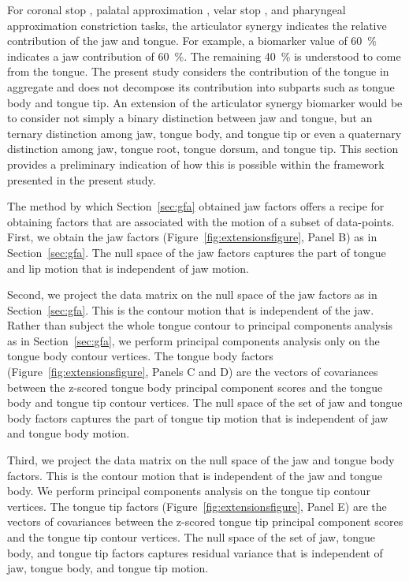 \documentclass[preprint]{JASAnew}\usepackage[]{graphicx}\usepackage[]{color}
\begin{document}
For coronal stop \textipa{[t]}, palatal approximation \textipa{[i]}, velar stop \textipa{[k]}, and pharyngeal approximation \textipa{[A]} constriction tasks,
the articulator synergy indicates the relative contribution of the jaw and tongue.
%
For example, a biomarker value of \SI{60}{\percent} indicates a jaw contribution of  \SI{60}{\percent}. The remaining \SI{40}{\percent} is understood to come from the tongue.
%
The present study considers the contribution of the tongue in aggregate and does not decompose its contribution into subparts such as tongue body and tongue tip.
%
An extension of the articulator synergy biomarker would be to consider not simply a binary distinction between jaw and tongue, but an ternary distinction among jaw, tongue body, and tongue tip or even a quaternary distinction among jaw, tongue root, tongue dorsum, and tongue tip.
%
This section provides a preliminary indication of how this is possible within the framework presented in the present study.



The method by which Section~\ref{sec:gfa} obtained jaw factors offers a recipe for obtaining factors that are associated with the motion of a subset of data-points. 
First, we obtain the jaw factors (Figure~\ref{fig:extensionsfigure}, Panel B) as in Section~\ref{sec:gfa}.
The null space of the jaw factors captures the part of tongue and lip motion that is independent of jaw motion. 

Second, we project the data matrix on the null space of the jaw factors as in Section~\ref{sec:gfa}. This is the contour motion that is independent of the jaw.
Rather than subject the whole tongue contour to principal components analysis as in Section~\ref{sec:gfa}, we perform principal components analysis only on the tongue body contour vertices.
The tongue body factors (Figure~\ref{fig:extensionsfigure}, Panels C and D) are the vectors of covariances between the z-scored tongue body principal component scores and the tongue body and tongue tip contour vertices.
The null space of the set of jaw and tongue body factors captures the part of tongue tip motion that is independent of jaw and tongue body motion.

Third, we project the data matrix on the null space of the jaw and tongue body factors. This is the contour motion that is independent of the jaw and tongue body.
We perform principal components analysis on the tongue tip contour vertices.
The tongue tip factors (Figure~\ref{fig:extensionsfigure}, Panel E) are the vectors of covariances between the z-scored tongue tip principal component scores and the tongue tip contour vertices.
The null space of the set of jaw, tongue body, and tongue tip factors captures residual variance that is independent of jaw, tongue body, and tongue tip motion.
\end{document}

